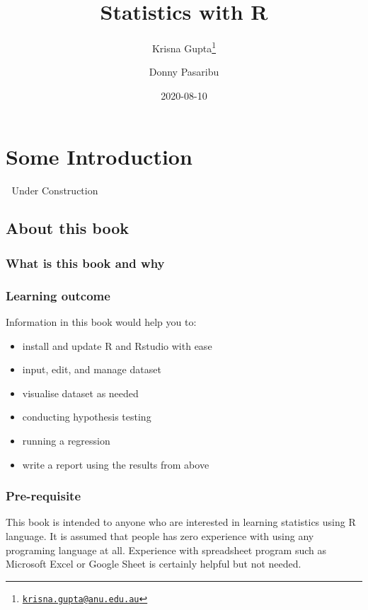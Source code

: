 \documentclass[
]{book}
\title{Statistics with R}
\author{Krisna Gupta\footnote{\href{mailto:krisna.gupta@anu.edu.au}{\nolinkurl{krisna.gupta@anu.edu.au}}} \and Donny Pasaribu}
\date{2020-08-10}
\providecommand{\tightlist}{%
  \setlength{\itemsep}{0pt}\setlength{\parskip}{0pt}}
\begin{document}
\maketitle

{
\setcounter{tocdepth}{1}
\tableofcontents
}
\hypertarget{some-introduction}{%
\chapter{Some Introduction}\label{some-introduction}}

🚧 Under Construction 🚧

\hypertarget{about-this-book}{%
\section{About this book}\label{about-this-book}}

\hypertarget{what-is-this-book-and-why}{%
\subsection{What is this book and why}\label{what-is-this-book-and-why}}

\hypertarget{learning-outcome}{%
\subsection{Learning outcome}\label{learning-outcome}}

Information in this book would help you to:

\begin{itemize}
\tightlist
\item
  install and update R and Rstudio with ease
\item
  input, edit, and manage dataset
\item
  visualise dataset as needed
\item
  conducting hypothesis testing
\item
  running a regression
\item
  write a report using the results from above
\end{itemize}

\hypertarget{pre-requisite}{%
\subsection{Pre-requisite}\label{pre-requisite}}

This book is intended to anyone who are interested in learning statistics using R language. It is assumed that people has zero experience with using any programing language at all. Experience with spreadsheet program such as Microsoft Excel or Google Sheet is certainly helpful but not needed.
\end{document}
